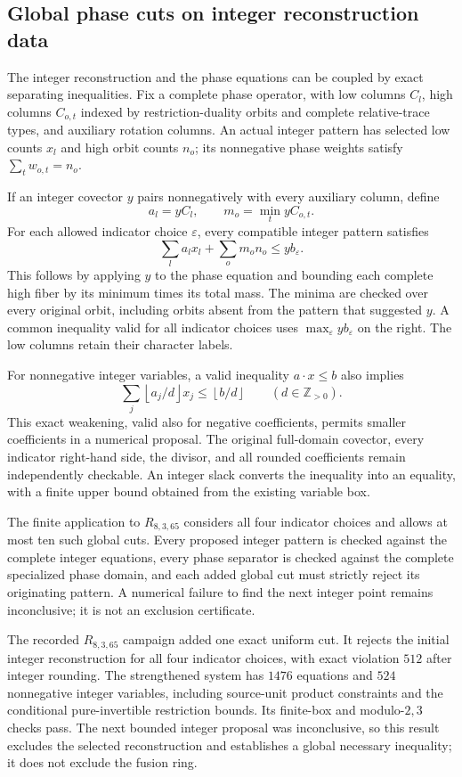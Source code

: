 \subsection{Global phase cuts on integer reconstruction data}

The integer reconstruction and the phase equations can be coupled by
exact separating inequalities.  Fix a complete phase operator, with
low columns $C_l$, high columns $C_{o,t}$ indexed by restriction-duality
orbits and complete relative-trace types, and auxiliary rotation
columns.  An actual integer pattern has selected low counts $x_l$ and
high orbit counts $n_o$; its nonnegative phase weights satisfy
$\sum_t w_{o,t}=n_o$.

If an integer covector $y$ pairs nonnegatively with every auxiliary
column, define
\[
 a_l=yC_l,\qquad m_o=\min_t yC_{o,t}.
\]
For each allowed indicator choice $\varepsilon$, every compatible
integer pattern satisfies
\[
 \sum_l a_lx_l+\sum_o m_on_o\le yb_\varepsilon.
\]
This follows by applying $y$ to the phase equation and bounding each
complete high fiber by its minimum times its total mass.  The minima
are checked over every original orbit, including orbits absent from
the pattern that suggested $y$.  A common inequality valid for all
indicator choices uses $\max_\varepsilon yb_\varepsilon$ on the right.
The low columns retain their character labels.

For nonnegative integer variables, a valid inequality $a\cdot x\le b$
also implies
\[
 \sum_j\left\lfloor a_j/d\right\rfloor x_j
 \le\left\lfloor b/d\right\rfloor\qquad(d\in\mathbb Z_{>0}).
\]
This exact weakening, valid also for negative coefficients, permits
smaller coefficients in a numerical proposal.  The original full-domain
covector, every indicator right-hand side, the divisor, and all rounded
coefficients remain independently checkable.  An integer slack converts
the inequality into an equality, with a finite upper bound obtained
from the existing variable box.

The finite application to $R_{8,3,65}$ considers all four indicator
choices and allows at most ten such global cuts.  Every proposed integer
pattern is checked against the complete integer equations, every phase
separator is checked against the complete specialized phase domain, and
each added global cut must strictly reject its originating pattern.
A numerical failure to find the next integer point remains inconclusive;
it is not an exclusion certificate.

The recorded $R_{8,3,65}$ campaign added one exact uniform cut.  It
rejects the initial integer reconstruction for all four indicator
choices, with exact violation $512$ after integer rounding.  The
strengthened system has $1476$ equations and $524$ nonnegative integer
variables, including source-unit product constraints and the conditional
pure-invertible restriction bounds.  Its finite-box and modulo-$2,3$
checks pass.  The next bounded integer proposal was inconclusive, so
this result excludes the selected reconstruction and establishes a
global necessary inequality; it does not exclude the fusion ring.

